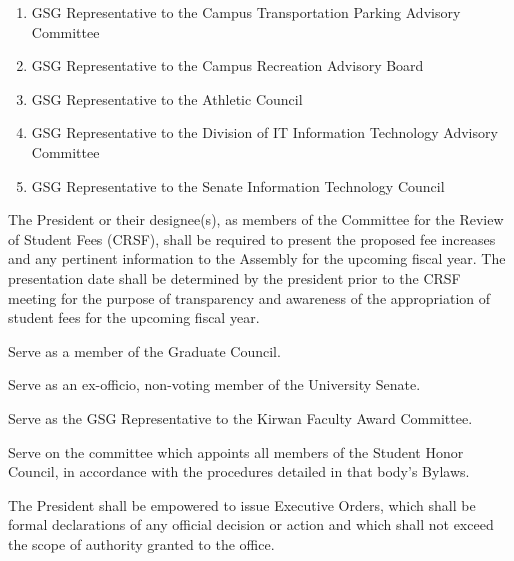 \begin{bylaws-number}
\begin{bylaws-number}
\begin{enumerate}[i]
      \item GSG Representative to the Campus Transportation Parking Advisory Committee
      \item GSG Representative to the Campus Recreation Advisory Board
      \item GSG Representative to the Athletic Council
      \item GSG Representative to the Division of IT Information Technology Advisory Committee
      \item GSG Representative to the Senate Information Technology Council
    \end{enumerate}
    \item The President or their designee(s), as members of the Committee for the Review of Student Fees (CRSF), shall be required to present the proposed fee increases and any pertinent information to the Assembly for the upcoming fiscal year. The presentation date shall be determined by the president prior to the CRSF meeting for the purpose of transparency and awareness of the appropriation of student fees for the upcoming fiscal year.
    \item Serve as a member of the Graduate Council.
    \item Serve as an ex-officio, non-voting member of the University Senate.
    \item Serve as the GSG Representative to the Kirwan Faculty Award Committee.
    \item Serve on the committee which appoints all members of the Student Honor Council, in accordance with the procedures detailed in that body’s Bylaws.
  \end{bylaws-number}
  \item The President shall be empowered to issue Executive Orders, which shall be formal declarations of any official decision or action and which shall not exceed the scope of authority granted to the office.
\end{bylaws-number}

